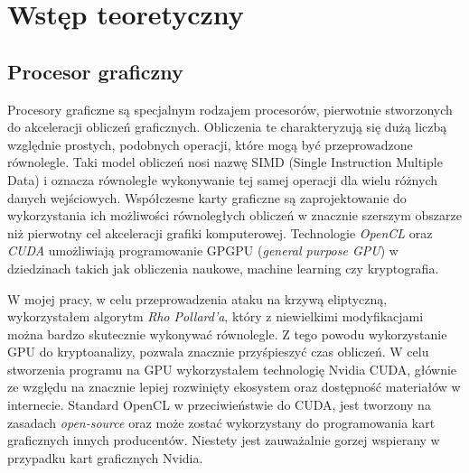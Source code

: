 \newpage
\section{Wstęp teoretyczny}

\subsection{Procesor graficzny}
Procesory graficzne są specjalnym rodzajem procesorów,
pierwotnie stworzonych do akceleracji obliczeń graficznych.
Obliczenia te charakteryzują się dużą liczbą względnie prostych, podobnych operacji,
które mogą być przeprowadzone równolegle.
Taki model obliczeń nosi nazwę SIMD (Single Instruction Multiple Data)
i oznacza równoległe wykonywanie tej samej operacji dla wielu różnych danych wejściowych.
Współczesne karty graficzne są zaprojektowanie do wykorzystania
ich możliwości równoległych obliczeń w znacznie szerszym obszarze niż
pierwotny cel akceleracji grafiki komputerowej.
Technologie \textit{OpenCL} oraz \textit{CUDA} umożliwiają
programowanie GPGPU (\textit{general purpose GPU}) w
dziedzinach takich jak obliczenia naukowe, machine learning czy kryptografia.

\par
W mojej pracy, w celu przeprowadzenia ataku na krzywą eliptyczną, wykorzystałem
algorytm \textit{Rho Pollard'a}, który z niewielkimi modyfikacjami można bardzo skutecznie wykonywać
równolegle. Z tego powodu wykorzystanie GPU do kryptoanalizy, pozwala znacznie przyśpieszyć czas
obliczeń. W celu stworzenia programu na GPU wykorzystałem technologię Nvidia CUDA, głównie ze względu
na znacznie lepiej rozwinięty ekosystem oraz dostępność materiałów w internecie.
Standard OpenCL w przeciwieństwie do CUDA, jest tworzony na zasadach \textit{open-source} oraz może zostać
wykorzystany do programowania kart graficznych innych producentów. Niestety jest zauważalnie
gorzej wspierany w przypadku kart graficznych Nvidia.
\par
